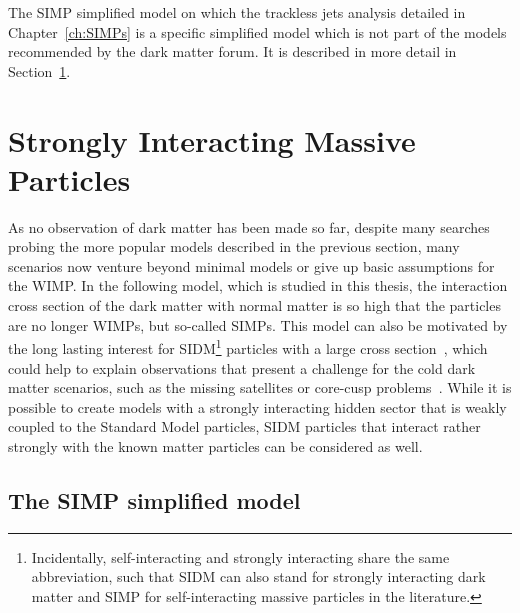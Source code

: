 The \acs{SIMP} simplified model on which the trackless jets analysis detailed in Chapter~\ref{ch:SIMPs} is a specific simplified model which is not part of the models recommended by the dark matter forum. It is described in more detail in Section~\ref{sec:SIMP}.

\section{Strongly Interacting Massive Particles}
\label{sec:SIMP}

As no observation of dark matter has been made so far, despite many searches probing the more popular models described in the previous section, many scenarios now venture beyond minimal models or give up basic assumptions for the \ac{WIMP}. In the following model, which is studied in this thesis, the interaction cross section of the dark matter with normal matter is so high that the particles are no longer \acp{WIMP}, but so-called \acp{SIMP}. This model can also be motivated by the long lasting interest for \ac{SIDM}\footnote{Incidentally, self-interacting and strongly interacting share the same abbreviation, such that SIDM can also stand for strongly interacting dark matter and SIMP for self-interacting massive particles in the literature.} particles with a large cross section~\cite{Spergel:1999mh}, which could help to explain observations that present a challenge for the cold dark matter scenarios, such as the missing satellites or core-cusp problems~\cite{Bullock:2010uy,BoylanKolchin:2011de, Weinberg:2013aya,Famaey:2013ty}. While it is possible to create models with a strongly interacting hidden sector that is weakly coupled to the Standard Model particles, \ac{SIDM} particles that interact rather strongly with the known matter particles can be considered as well.

\subsection{The SIMP simplified model}
\label{sec:SIMP_model}

